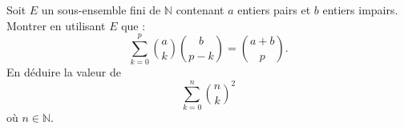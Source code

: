 \documentclass[../PolyS4.tex]{subfiles}
\begin{document}
\newpage


Soit \( E \) un sous-ensemble fini de \(\mathbb{N}\) contenant \( a \) entiers pairs et \( b \) entiers impairs. Montrer en utilisant \( E \) que : \\

\[
\sum_{k=0}^{p} \binom{a}{k} \binom{b}{p-k} = \binom{a+b}{p}.
\]
En déduire la valeur de 
\[
\sum_{k=0}^{n} \binom{n}{k}^2
\] 
où \( n \in \mathbb{N} \).\\









\end{document}
